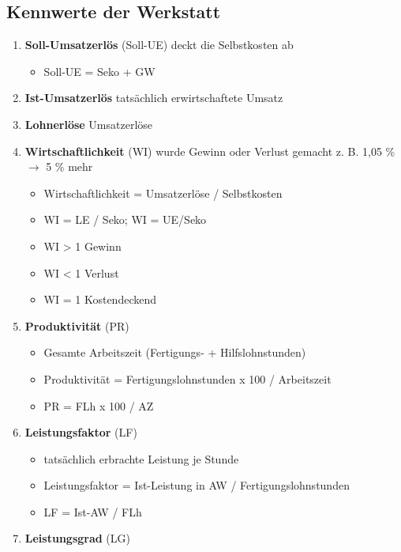 \newpage

\subsection{Kennwerte der Werkstatt}\label{kennwerte-der-werkstatt}

\begin{enumerate}
\item
  \textbf{Soll-Umsatzerlös} (Soll-UE) deckt die Selbstkosten ab

  \begin{itemize}
  \item
    Soll-UE = Seko + GW
  \end{itemize}
\item
  \textbf{Ist-Umsatzerlös} tatsächlich erwirtschaftete Umsatz
\item
  \textbf{Lohnerlöse} Umsatzerlöse
\item
  \textbf{Wirtschaftlichkeit} (WI) wurde Gewinn oder Verlust gemacht z.
  B. 1,05 \% $\to$ 5 \% mehr

  \begin{itemize}
  \item
    Wirtschaftlichkeit = Umsatzerlöse / Selbstkosten
  \item
    WI = LE / Seko; WI = UE/Seko
  \item
    WI > 1 Gewinn
  \item
    WI \textless{} 1 Verlust
  \item
    WI = 1 Kostendeckend
  \end{itemize}
\item
  \textbf{Produktivität} (PR)

  \begin{itemize}
  \item
    Gesamte Arbeitszeit (Fertigungs- + Hilfslohnstunden)
  \item
    Produktivität = Fertigungslohnstunden x 100 / Arbeitszeit
  \item
    PR = FLh x 100 / AZ\\
  \end{itemize}
\item
  \textbf{Leistungsfaktor} (LF)

  \begin{itemize}
  \item
    tatsächlich erbrachte Leistung je Stunde
  \item
    Leistungsfaktor = Ist-Leistung in AW / Fertigungslohnstunden
  \item
    LF = Ist-AW / FLh
  \end{itemize}
\item
  \textbf{Leistungsgrad} (LG)


\end{enumerate}
